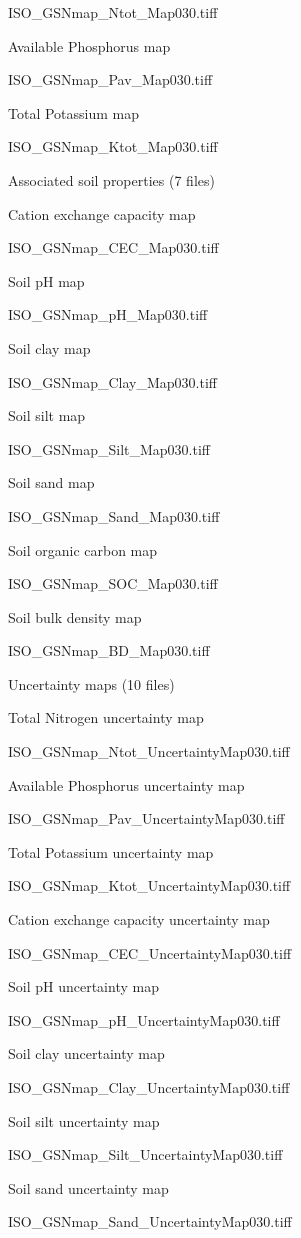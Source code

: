 \documentclass[
  10pt,
  b5paper,
  oneside]{book}
\begin{document}
ISO\_GSNmap\_Ntot\_Map030.tiff

Available Phosphorus map

ISO\_GSNmap\_Pav\_Map030.tiff

Total Potassium map

ISO\_GSNmap\_Ktot\_Map030.tiff

Associated soil properties (7 files)

Cation exchange capacity map

ISO\_GSNmap\_CEC\_Map030.tiff

Soil pH map

ISO\_GSNmap\_pH\_Map030.tiff

Soil clay map

ISO\_GSNmap\_Clay\_Map030.tiff

Soil silt map

ISO\_GSNmap\_Silt\_Map030.tiff

Soil sand map

ISO\_GSNmap\_Sand\_Map030.tiff

Soil organic carbon map

ISO\_GSNmap\_SOC\_Map030.tiff

Soil bulk density map

ISO\_GSNmap\_BD\_Map030.tiff

Uncertainty maps (10 files)

Total Nitrogen uncertainty map

ISO\_GSNmap\_Ntot\_UncertaintyMap030.tiff

Available Phosphorus uncertainty map

ISO\_GSNmap\_Pav\_UncertaintyMap030.tiff

Total Potassium uncertainty map

ISO\_GSNmap\_Ktot\_UncertaintyMap030.tiff

Cation exchange capacity uncertainty map

ISO\_GSNmap\_CEC\_UncertaintyMap030.tiff

Soil pH uncertainty map

ISO\_GSNmap\_pH\_UncertaintyMap030.tiff

Soil clay uncertainty map

ISO\_GSNmap\_Clay\_UncertaintyMap030.tiff

Soil silt uncertainty map

ISO\_GSNmap\_Silt\_UncertaintyMap030.tiff

Soil sand uncertainty map

ISO\_GSNmap\_Sand\_UncertaintyMap030.tiff
\end{document}
